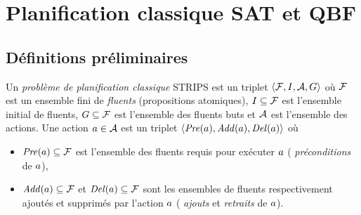\section{Planification classique SAT et QBF}
%



\subsection{Définitions préliminaires}


\begin{definition}
Un \emph{problème de planification classique} STRIPS est un triplet $\langle \mathcal{F}, I, \mathcal{A} , G \rangle$ où $\mathcal{F}$ est un ensemble fini de \emph{fluents} (propositions atomiques), $I \subseteq \mathcal{F}$ est l'ensemble initial de fluents, $G \subseteq \mathcal{F}$ est l'ensemble des fluents buts et $\mathcal{A}$ est l'ensemble des actions.
Une action $a \in \mathcal{A}$ est un triplet $\langle \mathit{Pre}(a), \mathit{Add}(a), \mathit{Del}(a) \rangle$ où

\begin{itemize}
\item $\mathit{Pre}(a) \subseteq \mathcal{F}$ est l'ensemble des fluents requis pour exécuter $a$ (%
\emph{préconditions} de $a$),
\item $\mathit{Add}(a) \subseteq \mathcal{F}$ et $\mathit{Del}(a) \subseteq \mathcal{F}$ sont les ensembles de fluents respectivement ajoutés et supprimés par l'action $a$ (%
\emph{ajouts} et %
\emph{retraits} de $a$).
\end{itemize}
\end{definition}

